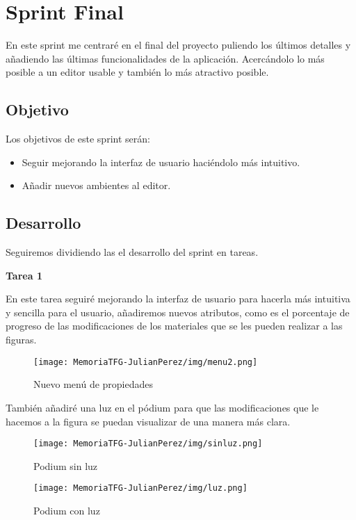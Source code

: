 \documentclass[a4paper, 12pt]{book}
\begin{document}
\section{Sprint Final}
En este sprint me centraré en el final del proyecto puliendo los últimos detalles y añadiendo las últimas funcionalidades de la aplicación. Acercándolo lo más posible a un editor usable y también lo más atractivo posible.

\subsection{Objetivo}
Los objetivos de este sprint serán:
\begin{itemize}
    \item Seguir mejorando la interfaz de usuario haciéndolo más intuitivo.
    \item Añadir nuevos ambientes al editor.
\end{itemize}

\subsection{Desarrollo}
Seguiremos dividiendo las el desarrollo del sprint en tareas.

\textbf{Tarea 1}

En este tarea seguiré mejorando la interfaz de usuario para hacerla más intuitiva y sencilla para el usuario, añadiremos nuevos atributos, como es el porcentaje de progreso de las modificaciones de los materiales que se les pueden realizar a las figuras.

\begin{figure}[H]
  \centering
  \texttt{[image: MemoriaTFG-JulianPerez/img/menu2.png]}
  \caption{Nuevo menú de propiedades}\label{menu2}
\end{figure}

También añadiré una luz en el pódium para que las modificaciones que le hacemos a la figura se puedan visualizar de una manera más clara.

\begin{figure}[H]
  \centering
  \begin{minipage}[b]{0.4\textwidth}
 \texttt{[image: MemoriaTFG-JulianPerez/img/sinluz.png]}
  \caption{Podium sin luz}\label{single}
  \end{minipage}
  \hfill
  \begin{minipage}[b]{0.4\textwidth}
  \texttt{[image: MemoriaTFG-JulianPerez/img/luz.png]}
  \caption{Podium con luz}\label{scrum}
  \end{minipage}
\end{figure}
\end{document}
